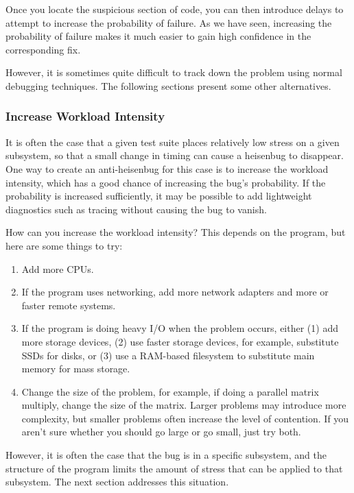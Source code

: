Once you locate the suspicious section of code, you can then introduce
delays to attempt to increase the probability of failure.
As we have seen, increasing the probability of failure makes it much
easier to gain high confidence in the corresponding fix.

However, it is sometimes quite difficult to track down the problem using
normal debugging techniques.
The following sections present some other alternatives.

\subsubsection{Increase Workload Intensity}
\label{sec:debugging:Increase Workload Intensity}

It is often the case that a given test suite places relatively
low stress on a given subsystem, so that a small change in timing
can cause a heisenbug to disappear.
One way to create an anti-heisenbug for this case is to increase
the workload intensity, which has a good chance of increasing the
bug's probability.
If the probability is increased sufficiently, it may be possible to
add lightweight diagnostics such as tracing without causing the
bug to vanish.

How can you increase the workload intensity?
This depends on the program, but here are some things to try:

\begin{enumerate}
\item	Add more CPUs.
\item	If the program uses networking, add more network adapters
	and more or faster remote systems.
\item	If the program is doing heavy I/O when the problem occurs,
	either (1) add more storage devices, (2) use faster storage
	devices, for example, substitute SSDs for disks,
	or (3) use a RAM-based filesystem to substitute main
	memory for mass storage.
\item	Change the size of the problem, for example, if doing a parallel
	matrix multiply, change the size of the matrix.
	Larger problems may introduce more complexity, but smaller
	problems often increase the level of contention.
	If you aren't sure whether you should go large or go small,
	just try both.
\end{enumerate}

However, it is often the case that the bug is in a specific subsystem,
and the structure of the program limits the amount of stress that can
be applied to that subsystem.
The next section addresses this situation.

